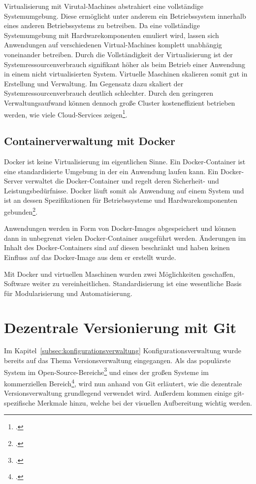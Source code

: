 Virtualisierung mit Virutal-Machines abstrahiert eine vollständige Systemumgebung. Diese ermöglicht unter anderem ein Betriebssystem innerhalb eines anderen Betriebssystems zu betreiben. Da eine vollständige Systemumgebung mit Hardwarekomponenten emuliert wird, lassen sich Anwendungen auf verschiedenen Virtual-Machines komplett unabhängig voneinander betreiben. 
Durch die Vollständigkeit der Virtualisierung ist der Systemressourcenverbrauch signifikant höher als beim Betrieb einer Anwendung in einem nicht virtualisierten System. Virtuelle Maschinen skalieren somit gut in Erstellung und Verwaltung. Im Gegensatz dazu skaliert der Systemressourcenverbrauch deutlich schlechter. Durch den geringeren Verwaltungsaufwand können dennoch große Cluster kosteneffizient betrieben werden, wie viele Cloud-Services zeigen\footcite[vgl.][]{a-cloud-guru-cost}.

\subsection{Containerverwaltung mit Docker}

Docker ist keine Virtualisierung im eigentlichen Sinne. Ein Docker-Container ist eine standardisierte Umgebung in der ein Anwendung laufen kann. Ein Docker-Server verwaltet die Docker-Container und regelt deren Sicherheit- und Leistungsbedürfnisse. Docker läuft somit als Anwendung auf einem System und ist an dessen Spezifikationen für Betriebssysteme und Hardwarekomponenten gebunden\footcite[Why are containers important][]{learn-docker}.

Anwendungen werden in Form von Docker-Images abgespeichert und können dann in unbegrenzt vielen Docker-Container ausgeführt werden. Änderungen im Inhalt des Docker-Containers sind auf diesen beschränkt und haben keinen Einfluss auf das Docker-Image aus dem er erstellt wurde.

Mit Docker und virtuellen Maschinen wurden zwei Möglichkeiten geschaffen, Software weiter zu vereinheitlichen. Standardisierung ist eine wesentliche Basis für Modularisierung und Automatisierung.

\section{Dezentrale Versionierung mit Git}

Im Kapitel~\ref{subsec:konfigurationsverwaltung} Konfigurationsverwaltung wurde bereits auf das Thema Versionsverwaltung 
eingegangen. Als das populärste System im Open-Source-Bereiche\footcite[vgl.][]{openhub-pie-chart} und eines der großen Systeme 
im kommerziellen Bereich\footcite[vgl.][]{g2crowd2018}, wird nun anhand von Git erläutert, wie die dezentrale Versionsverwaltung 
grundlegend verwendet wird. Außerdem kommen einige git-spezifische Merkmale hinzu, welche bei der visuellen Aufbereitung 
wichtig werden.

